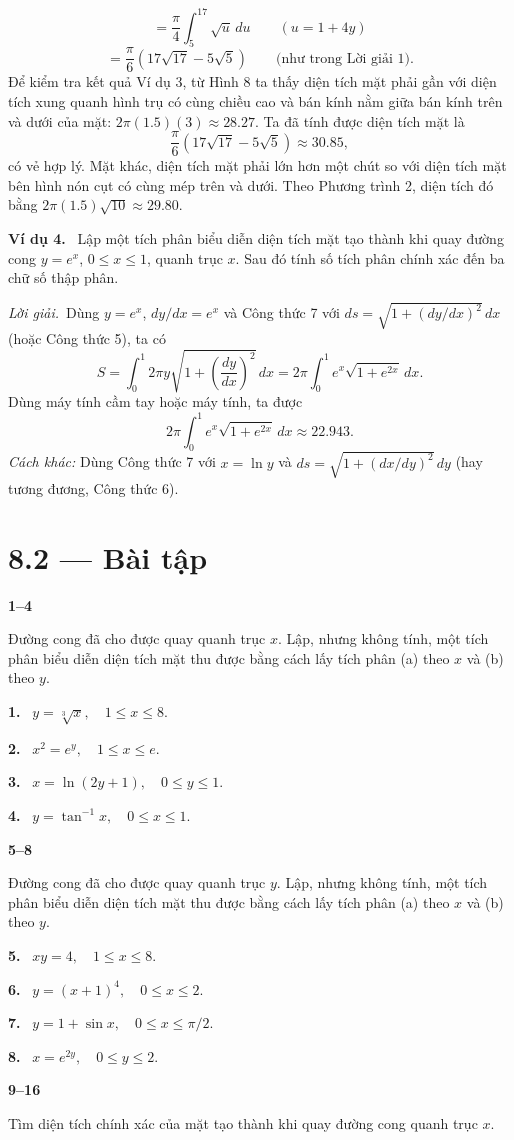 \documentclass[12pt,a4paper]{article}
\newcommand{\ex}[1]{\par\medskip\noindent\textbf{Ví dụ #1.}\ }
\newcommand{\sol}{\par\nopagebreak[4]\noindent\textit{Lời giải.}\ }
\newcommand{\bt}[1]{\par\smallskip\Needspace{5\baselineskip}\noindent\textbf{#1.}\ }
\newcommand{\group}[1]{\par\Needspace{11\baselineskip}\medskip\noindent\textbf{#1}\par\nopagebreak[4]}
\begin{document}
\[=\frac\pi4\int_5^{17}\sqrt{u}\,du\qquad(u=1+4y)\]
\[=\frac\pi6(17\sqrt{17}-5\sqrt5)\qquad\text{(như trong Lời giải 1).}\]
Để kiểm tra kết quả Ví dụ 3, từ Hình 8 ta thấy diện tích mặt phải gần với diện tích xung quanh hình trụ có cùng chiều cao và bán kính nằm giữa bán kính trên và dưới của mặt: $2\pi(1.5)(3)\approx28.27$. Ta đã tính được diện tích mặt là
\[\frac\pi6(17\sqrt{17}-5\sqrt5)\approx30.85,\]
có vẻ hợp lý. Mặt khác, diện tích mặt phải lớn hơn một chút so với diện tích mặt bên hình nón cụt có cùng mép trên và dưới. Theo Phương trình 2, diện tích đó bằng $2\pi(1.5)\sqrt{10}\approx29.80$.
\ex{4} Lập một tích phân biểu diễn diện tích mặt tạo thành khi quay đường cong $y=e^x$, $0\le x\le1$, quanh trục $x$. Sau đó tính số tích phân chính xác đến ba chữ số thập phân.
\sol Dùng $y=e^x$, $dy/dx=e^x$ và Công thức 7 với $ds=\sqrt{1+(dy/dx)^2}\,dx$ (hoặc Công thức 5), ta có
\[S=\int_0^{1}2\pi y\sqrt{1+\left(\frac{dy}{dx}\right)^2}\,dx=2\pi\int_0^1e^x\sqrt{1+e^{2x}}\,dx.\]
Dùng máy tính cầm tay hoặc máy tính, ta được
\[2\pi\int_0^1e^x\sqrt{1+e^{2x}}\,dx\approx22.943.\]
\textit{Cách khác:} Dùng Công thức 7 với $x=\ln y$ và $ds=\sqrt{1+(dx/dy)^2}\,dy$ (hay tương đương, Công thức 6).

\section*{8.2 — Bài tập}

\group{1–4} Đường cong đã cho được quay quanh trục $x$. Lập, nhưng không tính, một tích phân biểu diễn diện tích mặt thu được bằng cách lấy tích phân (a) theo $x$ và (b) theo $y$.

\bt{1} $y=\sqrt[3]x,\quad1\le x\le8$.

\bt{2} $x^2=e^y,\quad1\le x\le e$.

\bt{3} $x=\ln(2y+1),\quad0\le y\le1$.

\bt{4} $y=\tan^{-1}x,\quad0\le x\le1$.

\group{5–8} Đường cong đã cho được quay quanh trục $y$. Lập, nhưng không tính, một tích phân biểu diễn diện tích mặt thu được bằng cách lấy tích phân (a) theo $x$ và (b) theo $y$.

\bt{5} $xy=4,\quad1\le x\le8$.

\bt{6} $y=(x+1)^4,\quad0\le x\le2$.

\bt{7} $y=1+\sin x,\quad0\le x\le\pi/2$.

\bt{8} $x=e^{2y},\quad0\le y\le2$.

\group{9–16} Tìm diện tích chính xác của mặt tạo thành khi quay đường cong quanh trục $x$.
\end{document}
